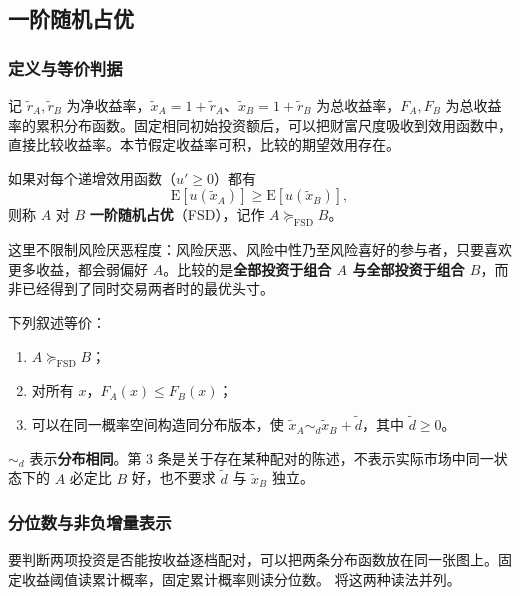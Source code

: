 \subsection{一阶随机占优}
\subsubsection{定义与等价判据}
记 $\tilde r_A,\tilde r_B$ 为净收益率，$\tilde x_A=1+\tilde r_A$、$\tilde x_B=1+\tilde r_B$ 为总收益率，$F_A,F_B$ 为总收益率的累积分布函数。固定相同初始投资额后，可以把财富尺度吸收到效用函数中，直接比较收益率。本节假定收益率可积，比较的期望效用存在。

\begin{tcolorbox}[knowledge]
 如果对每个递增效用函数（$u'\ge0$）都有
\[
 \mathrm E[u(\tilde x_A)]\ge\mathrm E[u(\tilde x_B)],
\]
则称 $A$ 对 $B$ \textbf{一阶随机占优}（FSD），记作 $A\succeq_{\mathrm{FSD}}B$。
\end{tcolorbox}
这里不限制风险厌恶程度：风险厌恶、风险中性乃至风险喜好的参与者，只要喜欢更多收益，都会弱偏好 $A$。比较的是\textbf{全部投资于组合 $A$ 与全部投资于组合 $B$}，而非已经得到了同时交易两者时的最优头寸。

\begin{tcolorbox}[knowledge]
 下列叙述等价：
\begin{enumerate}
 \item $A\succeq_{\mathrm{FSD}}B$；
 \item 对所有 $x$，$F_A(x)\le F_B(x)$；
 \item 可以在同一概率空间构造同分布版本，使
 $\tilde x_A\sim_d\tilde x_B+\tilde d$，其中 $\tilde d\ge0$。
\end{enumerate}
\end{tcolorbox}
$\sim_d$ 表示\textbf{分布相同}。第 3 条是关于存在某种配对的陈述，不表示实际市场中同一状态下的 $A$ 必定比 $B$ 好，也不要求 $\tilde d$ 与 $\tilde x_B$ 独立。

\subsubsection{分位数与非负增量表示}
要判断两项投资是否能按收益逐档配对，可以把两条分布函数放在同一张图上。固定收益阈值读累计概率，固定累计概率则读分位数。 将这两种读法并列。

